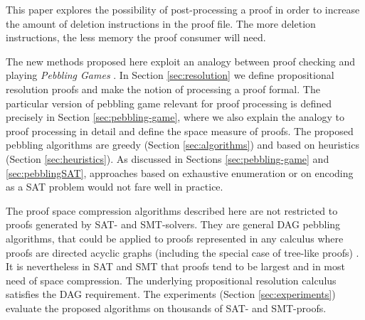 This paper explores the possibility of post-processing a proof in order to increase the amount of deletion instructions in the proof file. The more deletion instructions, the less memory the proof consumer will need. 


The new methods proposed here exploit an analogy between proof checking and playing \emph{Pebbling Games} \cite{Kasai1979,Gilbert1980}.
In Section \ref{sec:resolution} we define propositional resolution proofs and make the notion of processing a proof formal.
The particular version of pebbling game relevant for proof processing is defined precisely in Section \ref{sec:pebbling-game}, where we also explain the analogy to proof processing in detail and define the space measure of proofs. The proposed pebbling algorithms are greedy (Section \ref{sec:algorithms}) and based on heuristics (Section \ref{sec:heuristics}). As discussed in Sections \ref{sec:pebbling-game} and \ref{sec:pebblingSAT}, approaches based on exhaustive enumeration or on encoding as a SAT problem would not fare well in practice.

The proof space compression algorithms described here are not restricted to proofs generated by SAT- and SMT-solvers. They are general DAG pebbling algorithms, that could be applied to proofs represented in any calculus where proofs are directed acyclic graphs (including the special case of tree-like proofs) \cite{APPA}. It is nevertheless in SAT and SMT that proofs tend to be largest and in most need of space compression. The underlying propositional resolution calculus satisfies the DAG requirement. The experiments (Section \ref{sec:experiments}) evaluate the proposed algorithms on thousands of SAT- and SMT-proofs.


